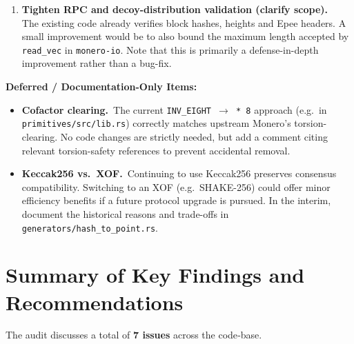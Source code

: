 \documentclass[12pt,a4paper]{article}
\begin{document}
\begin{enumerate}[label=\textbf{A\arabic*.}]
  \item \textbf{Tighten RPC and decoy-distribution validation (clarify scope).}\\
        The existing code already verifies block hashes, heights and
        Epee headers.  A small improvement would be to also bound the maximum length
        accepted by \texttt{read\_vec} in \texttt{monero-io}.  Note that this is
        primarily a defense-in-depth improvement rather than a bug-fix.
\end{enumerate}

\vspace{2ex}
\noindent\textbf{Deferred / Documentation-Only Items:}
\begin{itemize}
  \item \textbf{Cofactor clearing.}~The current \texttt{INV\_EIGHT~$\rightarrow$~*\,8}
        approach (e.g.\ in \\
        \texttt{primitives/src/lib.rs}) correctly matches
        upstream Monero’s torsion-clearing. No code changes are strictly needed,
        but add a comment citing relevant torsion-safety references to prevent
        accidental removal.

  \item \textbf{Keccak256 vs.\ XOF.}~Continuing to use Keccak256 preserves
        consensus compatibility. Switching to an XOF (e.g.\ SHAKE-256) could
        offer minor efficiency benefits if a future protocol upgrade is pursued.
        In the interim, document the historical reasons and trade-offs in
        \texttt{generators/hash\_to\_point.rs}.
\end{itemize}



\section{Summary of Key Findings and Recommendations}
\label{sec:summary-findings}

The audit discusses a total of \textbf{7 issues} across the code‑base.
\end{document}
